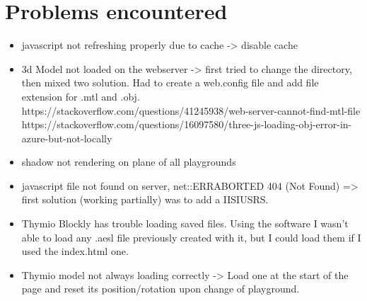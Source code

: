 \documentclass{scrartcl}
\begin{document}
\listoffigures

\section{Problems encountered}
\begin{itemize}
  \item javascript not refreshing properly due to cache -> disable cache
  \item 3d Model not loaded on the webserver -> first tried to change the directory, then mixed two solution. 
        Had to create a web.config file and add file extension for .mtl and .obj.
        https://stackoverflow.com/questions/41245938/web-server-cannot-find-mtl-file
        https://stackoverflow.com/questions/16097580/three-js-loading-obj-error-in-azure-but-not-locally
  \item shadow not rendering on plane of all playgrounds
  \item javascript file not found on server, net::ERR\textunderscore ABORTED 404 (Not Found) => first solution (working partially) was to add a IIS\textunderscore IUSRS.
  \item Thymio Blockly has trouble loading saved files. Using the software I wasn't able to load any .aesl file previously created with it, but I could load them if I used the index.html one.
  \item Thymio model not always loading correctly -> Load one at the start of the page and reset its position/rotation upon change of playground.
\end{itemize}

\printbibliography[heading=bibintoc]
\end{document}
